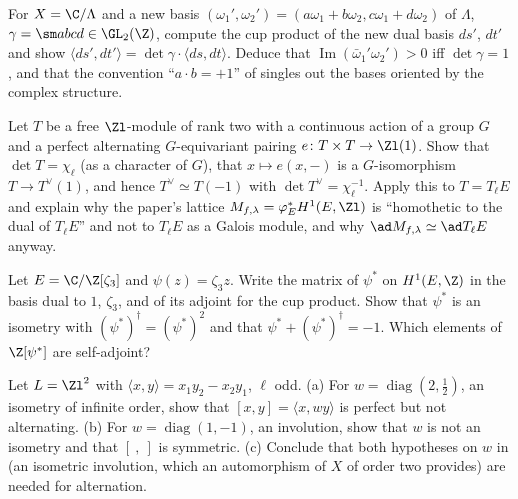 \begin{exercise}\label{ex:curves:ex-basis-change}
For $X=\C/\Lambda$ and a new basis $(\omega_1',\omega_2')=(a\omega_1+b\omega_2,c\omega_1+d\omega_2)$ of $\Lambda$, $\gamma=\sm abcd\in\GL_2(\Z)$, compute the cup product of the new dual basis
$ds'$, $dt'$ and show $\langle ds',dt'\rangle=\det\gamma\cdot\langle ds,dt\rangle$. Deduce that $\operatorname{Im}(\bar\omega_1'\omega_2')>0$ iff $\det\gamma=1$, and that the convention ``$a\cdot b=+1$'' of
 singles out the bases oriented by the complex structure.
\end{exercise}

\begin{exercise}\label{ex:curves:ex-weil}
Let $T$ be a free $\Zl$-module of rank two with a continuous action of a group $G$ and a perfect alternating $G$-equivariant pairing $e\colon T\times T\to\Zl(1)$. Show that $\det T=\chi_\ell$ (as a
character of $G$), that $x\mapsto e(x,-)$ is a $G$-isomorphism $T\to T^\vee(1)$, and hence $T^\vee\simeq T(-1)$ with $\det T^\vee=\chi_\ell^{-1}$. Apply this to $T=T_\ell E$ and explain why the
paper's lattice $M_{f,\lambda}=\varphi_E^*H^1(E,\Zl)$ is ``homothetic to the dual of $T_\ell E$'' and not to $T_\ell E$ as a Galois module, and why $\ad M_{f,\lambda}\simeq\ad T_\ell E$ anyway.
\end{exercise}

\begin{exercise}\label{ex:curves:ex-zeta3}
Let $E=\C/\Z[\zeta_3]$ and $\psi(z)=\zeta_3z$. Write the matrix of $\psi^*$ on $H^1(E,\Z)$ in the basis dual to $1$, $\zeta_3$, and of its adjoint for the cup product. Show that $\psi^*$ is an
isometry with $(\psi^*)^\dagger=(\psi^*)^2$ and that $\psi^*+(\psi^*)^\dagger=-1$. Which elements of $\Z[\psi^*]$ are self-adjoint?
\end{exercise}

\begin{exercise}\label{ex:curves:ex-twist-counter}
Let $L=\Zl^2$ with $\langle x,y\rangle=x_1y_2-x_2y_1$, $\ell$ odd. (a) For $w=\operatorname{diag}(2,\frac12)$, an isometry of infinite order, show that $[x,y]=\langle x,wy\rangle$ is perfect but not alternating. (b) For
$w=\operatorname{diag}(1,-1)$, an involution, show that $w$ is not an isometry and that $[\ ,\ ]$ is symmetric. (c) Conclude that both hypotheses on $w$ in 
(an isometric involution, which an automorphism of $X$ of order two provides) are needed for alternation.
\end{exercise}

